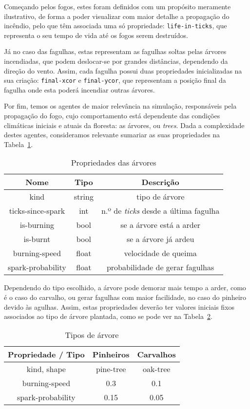 Começando pelos fogos, estes foram definidos com um propósito meramente ilustrativo, de forma a poder visualizar com maior detalhe a propagação do incêndio, pelo que têm associada uma só propriedade: \texttt{life-in-ticks}, que representa o seu tempo de vida até os fogos serem destruídos.

Já no caso das fagulhas, estas representam as fagulhas soltas pelas árvores incendiadas, que podem deslocar-se por grandes distâncias, dependendo da direção do vento. Assim, cada fagulha possui duas propriedades inicializadas na sua criação: \texttt{final-xcor} e \texttt{final-ycor}, que representam a posição final da fagulha onde esta poderá incendiar outras árvores.

Por fim, temos os agentes de maior relevância na simulação, responsáveis pela propagação do fogo, cujo comportamento está dependente das condições climáticas iniciais e atuais da floresta: as árvores, ou \textit{trees}. Dada a complexidade destes agentes, consideramos relevante sumariar as suas propriedades na Tabela~\ref{tab:tree_props}.

\begin{table}[tbhp]
    \centering
    \begin{tabular}{ccc} \hline
    \textbf{Nome} & \textbf{Tipo} & \textbf{Descrição} \\ \hline
    kind & string & tipo de árvore \\
    ticks-since-spark & int & n.º de \textit{ticks} desde a última fagulha \\
    is-burning & bool & se a árvore está a arder \\
    is-burnt & bool & se a árvore já ardeu \\
    burning-speed & float & velocidade de queima \\
    spark-probability & float & probabilidade de gerar fagulhas \\ \hline
    \end{tabular}
    \caption{Propriedades das árvores}
    \label{tab:tree_props}
\end{table}

Dependendo do tipo escolhido, a árvore pode demorar mais tempo a arder, como é o caso do carvalho, ou gerar fagulhas com maior facilidade, no caso do pinheiro devido às agulhas. Assim, estas propriedades deverão ter valores iniciais fixos associados ao tipo de árvore plantada, como se pode ver na Tabela~\ref{tab:tree_types}.

\begin{table}[tbhp]
    \centering
    \begin{tabular}{ccc} \hline
    \textbf{Propriedade / Tipo} & \textbf{Pinheiros} & \textbf{Carvalhos} \\ \hline
    kind, shape & pine-tree & oak-tree \\
    burning-speed & 0.3 & 0.1 \\
    spark-probability & 0.15 & 0.05 \\ \hline
    \end{tabular}
    \caption{Tipos de árvore}
    \label{tab:tree_types}
\end{table}

